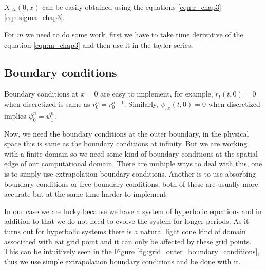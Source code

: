 $X_{,tt}(0,x)$ can be easily obtained using the equations \ref{eqn:r_chap3}-\ref{eqn:sigma_chap3}.


For $m$ we need to do some work, first we have to take time derivative of the equation \ref{eqn:m_chap3} and then use it in the taylor series.


\subsection{Boundary conditions}
\label{chap3:boundary_conditinos}

Boundary conditions at $x=0$ are easy to implement, for example, $r_t(t,0) = 0$ when discretized is same as $r^{n}_0 = r^{n-1}_0$. Similarly, $\psi_{,x}(t,0) = 0 $ when discretized implies $\psi^{n}_0 = \psi^{n}_1$.

Now, we need the boundary conditions at the outer boundary, in the physical space this is same as the boundary conditions at infinity. But we are working with a finite domain so we need some kind of boundary conditions at the spatial edge of our computational domain. There are multiple ways to deal with this, one is to simply use extrapolation boundary conditions. Another is to use absorbing boundary conditions or free boundary conditions, both of these are usually more accurate but at the same time harder to implement.

In our case we are lucky because we have a system of hyperbolic equations and in addition to that we do not need to evolve the system for longer periods.
As it turns out for hyperbolic systems there is a natural light cone kind of domain associated with eat grid point and it can only be affected by these grid points.
This can be intuitively seen in the Figure \ref{fig:grid_outer_boundary_conditions}, thus we use simple extrapolation boundary conditions and be done with it.


